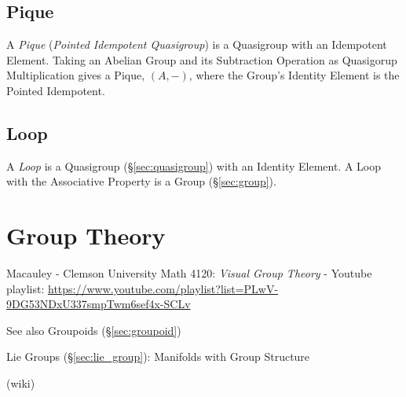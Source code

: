 \subsection{Pique}\label{sec:pique}

A \emph{Pique} (\emph{Pointed Idempotent Quasigroup}) is a Quasigroup
with an Idempotent Element. Taking an Abelian Group and its
Subtraction Operation as Quasigorup Multiplication gives a Pique,
$(A,-)$, where the Group's Identity Element is the Pointed Idempotent.



\subsection{Loop}\label{sec:quasigroup_loop}

A \emph{Loop} is a Quasigroup (\S\ref{sec:quasigroup}) with an
Identity Element. A Loop with the Associative Property is a Group
(\S\ref{sec:group}).



\section{Group Theory}\label{sec:group_theory}

Macauley - Clemson University Math 4120: \emph{Visual Group Theory} - Youtube
playlist:
\url{https://www.youtube.com/playlist?list=PLwV-9DG53NDxU337smpTwm6sef4x-SCLv}

\fist See also Groupoids (\S\ref{sec:groupoid})

\fist Lie Groups (\S\ref{sec:lie_group}): Manifolds with Group Structure

(wiki)

